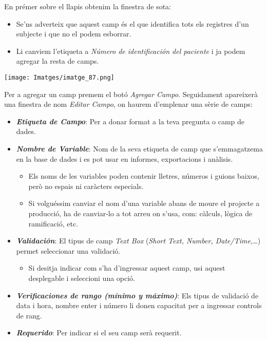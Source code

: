 \documentclass[
]{article}
\providecommand{\tightlist}{%
  \setlength{\itemsep}{0pt}\setlength{\parskip}{0pt}}
\begin{document}
En prémer sobre el llapis obtenim la finestra de sota:

\begin{itemize}
\tightlist
\item
  Se'ns adverteix que aquest camp és el que identifica tots els registres d'un subjecte i que no el podem esborrar.
\item
  Li canviem l'etiqueta a \emph{Número de identificación del paciente} i ja podem agregar la resta de camps.
\end{itemize}

\texttt{[image: Imatges/imatge\_87.png]}

Per a agregar un camp premem el botó \emph{Agregar Campo}. Seguidament apareixerà una finestra de nom \emph{Editar Campo}, on haurem d'emplenar una sèrie de camps:

\begin{itemize}
\tightlist
\item
  \textbf{\emph{Etiqueta de Campo}}: Per a donar format a la teva pregunta o camp de dades.
\item
  \textbf{\emph{Nombre de Variable}}: Nom de la seva etiqueta de camp que s'emmagatzema en la base de dades i es pot usar en informes, exportacions i anàlisis.

  \begin{itemize}
  \tightlist
  \item
    Els noms de les variables poden contenir lletres, números i guions baixos, però no espais ni caràcters especials.
  \item
    Si volguéssim canviar el nom d'una variable abans de moure el projecte a producció, ha de canviar-lo a tot arreu on s'usa, com: càlculs, lògica de ramificació, etc.
  \end{itemize}
\item
  \textbf{\emph{Validación}}: El tipus de camp \emph{Text Box} (\emph{Short Text, Number, Date/Time,\ldots{}}) permet seleccionar una validació.

  \begin{itemize}
  \tightlist
  \item
    Si desitja indicar com s'ha d'ingressar aquest camp, usi aquest desplegable i seleccioni una opció.
  \end{itemize}
\item
  \textbf{\emph{Verificaciones de rango (mínimo y máximo)}}: Els tipus de validació de data i hora, nombre enter i número li donen capacitat per a ingressar controls de rang.
\item
  \textbf{\emph{Requerido}}: Per indicar si el seu camp serà requerit.


\end{itemize}
\end{document}

